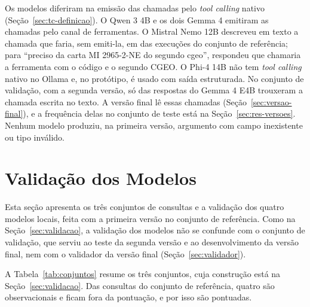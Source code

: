 Os modelos diferiram na emissão das chamadas pelo \textit{tool calling} nativo (Seção~\ref{sec:tc-definicao}). O Qwen 3 4B e os dois Gemma 4 emitiram as chamadas pelo canal de ferramentas. O Mistral Nemo 12B descreveu em texto a chamada que faria, sem emiti-la, em  das  execuções do conjunto de referência; para ``preciso da carta MI 2965-2-NE do segundo cgeo'', respondeu que chamaria a ferramenta com o código e o segundo CGEO. O Phi-4 14B não tem \textit{tool calling} nativo no Ollama e, no protótipo, é usado com saída estruturada. No conjunto de validação, com a segunda versão, só  das  respostas do Gemma 4 E4B trouxeram a chamada escrita no texto. A versão final lê essas chamadas (Seção~\ref{sec:versao-final}), e a frequência delas no conjunto de teste está na Seção~\ref{sec:res-versoes}. Nenhum modelo produziu, na primeira versão, argumento com campo inexistente ou tipo inválido.

\section{Validação dos Modelos}
\label{sec:res-validacao}

Esta seção apresenta os três conjuntos de consultas e a validação dos quatro modelos locais, feita com a primeira versão no conjunto de referência. Como na Seção~\ref{sec:validacao}, a validação dos modelos não se confunde com o conjunto de validação, que serviu ao teste da segunda versão e ao desenvolvimento da versão final, nem com o validador da versão final (Seção~\ref{sec:validador}).

A Tabela~\ref{tab:conjuntos} resume os três conjuntos, cuja construção está na Seção~\ref{sec:validacao}. Das  consultas do conjunto de referência, quatro são observacionais e ficam fora da pontuação, e por isso  são pontuadas.

